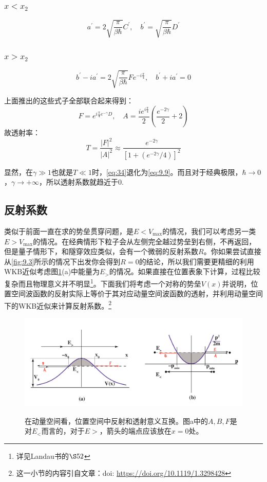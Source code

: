\documentclass[a4paper,zihao=-4,linespread=1]{ctexrep}
\newcommand{\DOI}[1]{doi: \href{https://doi.org/#1}{#1}} %
\begin{document}
    \subsubsection*{$x<x_2$}
    \begin{equation}
        a^\prime=2\sqrt{\frac{\pi}{\beta\hbar}}C^\prime,\quad b^\prime=\sqrt{\frac{\pi}{\beta\hbar}}D^\prime
    \end{equation}
    \subsubsection*{$x>x_2$}
    \begin{equation}
        b^\prime-ia^\prime = 2\sqrt{\frac{\pi}{\beta\hbar}}Fe^{-i\frac{\pi}{4}},\quad b^\prime+ia^\prime=0
    \end{equation}
    
    上面推出的这些式子全部联合起来得到：
    \begin{equation}
        F=e^{i\frac{\pi}{4}e^{-\gamma}D},\quad A=\frac{ie^{i\frac{\pi}{4}}}{2}\left(\frac{e^{-2\gamma}}{2}+2\right)
    \end{equation}
    故透射率：
    \begin{equation}
        \label{eq:34}
        \boxed{
            T=\frac{|F|^2}{|A|^2}\approx \frac{e^{-2\gamma}}{\left[1+\left(e^{-2\gamma}/4\right)\right]^2}
        }
    \end{equation}

    显然，在$\gamma\gg 1$也就是$T\ll 1$时，\ref{eq:34}退化为\ref{eq:9.9}。而且对于经典极限，$\hbar\to 0$，$\gamma\to+\infty$，所以透射系数就趋近于0.
    
    \subsection*{反射系数}
    类似于前面一直在求的势垒贯穿问题，是$E<V_{\max}$的情况，我们可以考虑另一类$E>V_{\max}$的情况。在经典情形下粒子会从左侧完全越过势垒到右侧，不再返回，但是量子情形下，和隧穿效应类似，会有一个微弱的反射系数$R$。你如果尝试直接从\ref{fig:9.3}所示的情况下出发你会得到$R=0$的结论，所以我们需要更精细的利用WKB近似考虑图\ref{fig:9.7}(a)中能量为$E_>$的情况。如果直接在位置表象下计算，过程比较复杂而且物理意义并不明显\footnote{详见Landau书的$\S 52$}。下面我们将考虑一个对称的势垒$V(x)$并说明，位置空间波函数的反射实际上等价于其对应动量空间波函数的透射，并利用动量空间下的WKB近似来计算反射系数。\footnote{这一小节的内容引自文章：\DOI{https://doi.org/10.1119/1.3298428}}
    \begin{figure}[h]
    	\centering
    	\includegraphics[width=0.8\linewidth]{fig/9-7.pdf}
    	\label{fig:9.7}
    	\caption{在动量空间看，位置空间中反射和透射意义互换。图a中的$A,B,F$是对$E_<$而言的，对于$E>$，箭头的端点应该放在$x=0$处。}
    \end{figure}
    
\end{document}
